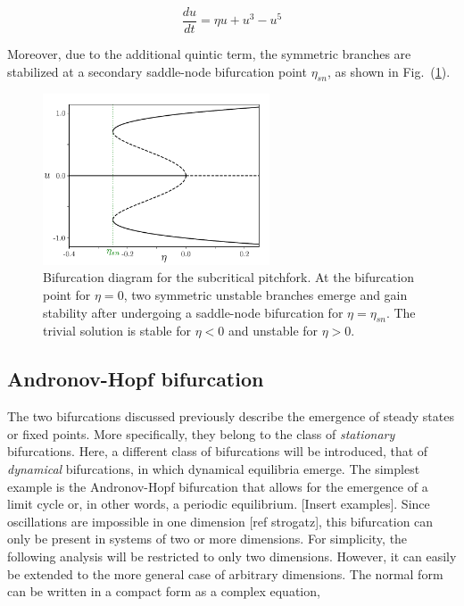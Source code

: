 \begin{equation}
    \dfrac{du}{dt} = \eta u + u ^ 3 - u^5
    \label{eq:pre_bif_pitchfork_subcritical}
\end{equation}

Moreover, due to the additional quintic term, the symmetric branches are stabilized 
at a secondary saddle-node bifurcation point $\eta_{sn}$, as shown
in Fig.~(\ref{fig:pre_bif_subpitchfork}).

\begin{figure}[h]
    \centering
    \includegraphics[width=0.6\textwidth]{imagenes/framework/bif_pitch_subcritical.pdf}
    \caption{Bifurcation diagram for the subcritical pitchfork. At the bifurcation point
    for $\eta=0$, two symmetric unstable branches emerge and gain stability after undergoing
    a saddle-node bifurcation for $\eta=\eta_{sn}$. The trivial solution is stable for $\eta < 0$
    and unstable for $\eta > 0$.}
    \label{fig:pre_bif_subpitchfork}
\end{figure}


\subsection{Andronov-Hopf bifurcation}

The two bifurcations discussed previously describe the emergence of steady states or fixed points. 
More specifically, they belong to the class of {\em stationary} bifurcations. Here, a different class of bifurcations will be introduced,
that of {\em dynamical} bifurcations, in which dynamical equilibria emerge. The simplest example is the Andronov-Hopf bifurcation
that allows for the emergence of a limit cycle or, in other words, a periodic equilibrium. [Insert examples]. Since oscillations are impossible in 
one dimension [ref strogatz], this bifurcation can only be present in systems of two or more dimensions. For simplicity, the following
analysis will be restricted to only two dimensions. However, it can easily be extended to the more general case of arbitrary dimensions.
The normal form can be written in a compact form as a complex equation,

